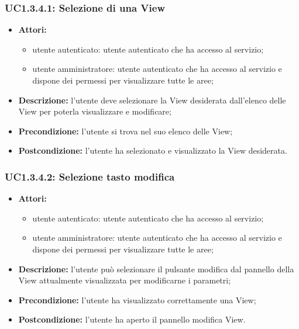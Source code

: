 \subsubsection{UC1.3.4.1: Selezione di una View}

\begin{itemize}
    \item \textbf{Attori:}
    \begin{itemize}
    	\item utente autenticato: utente autenticato che ha accesso al servizio;
    	\item utente amministratore: utente autenticato che ha accesso al servizio e dispone dei permessi per visualizzare tutte le aree;
	\end{itemize}
    \item \textbf{Descrizione:} l'utente deve selezionare la View desiderata dall'elenco delle View per poterla visualizzare e modificare;
    \item \textbf{Precondizione:} l'utente si trova nel suo elenco delle View;
    \item \textbf{Postcondizione:} l'utente ha selezionato e visualizzato la View desiderata.
\end{itemize}

\subsubsection{UC1.3.4.2: Selezione tasto modifica}

\begin{itemize}
   	\item \textbf{Attori:}
    \begin{itemize}
    	\item utente autenticato: utente autenticato che ha accesso al servizio;
    	\item utente amministratore: utente autenticato che ha accesso al servizio e dispone dei permessi per visualizzare tutte le aree;
	\end{itemize}
    \item \textbf{Descrizione:} l'utente può selezionare il pulsante modifica dal pannello della View attualmente visualizzata per modificarne i parametri;
    \item \textbf{Precondizione:} l'utente ha visualizzato correttamente una View;
    \item \textbf{Postcondizione:} l'utente ha aperto il pannello modifica View.
\end{itemize}

